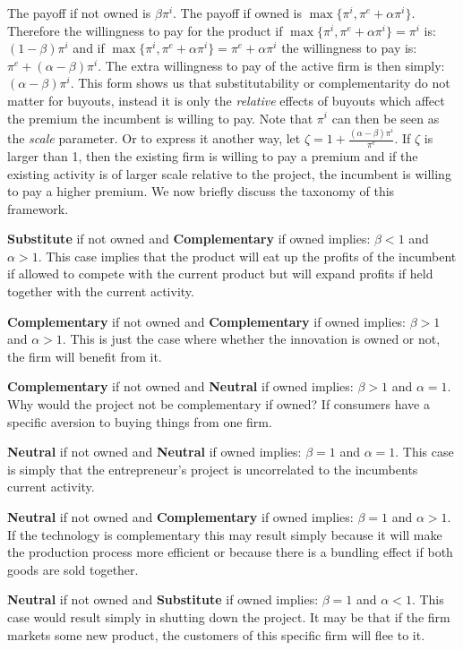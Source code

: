The payoff if not owned is $ \beta \pi^i$. The payoff if owned is $\max\{ \pi^i, \pi^e + \alpha \pi^i   \}$. Therefore the willingness to pay for the product if  $\max\{ \pi^i, \pi^e + \alpha \pi^i   \} = \pi^i $ is: $(1-\beta) \pi^i$ and if $\max\{ \pi^i, \pi^e + \alpha \pi^i   \} = \pi^e + \alpha \pi^i $ the willingness to pay is: $\pi^e+ (\alpha-\beta) \pi^i$. The extra willingness to pay of the active firm is then simply: $(\alpha-\beta)\pi^i$. This form shows us that substitutability or complementarity do not matter for buyouts, instead it is only the \textit{relative} effects of buyouts which affect the premium the incumbent is willing to pay. Note that $\pi^i$ can then be seen as the \textit{scale} parameter. Or to express it another way, let $\zeta=1 + \frac{(\alpha-\beta)\pi^i}{\pi^e}$. If $\zeta$ is larger than 1, then the existing firm is willing to pay a premium and if the existing activity is of larger scale relative to the project, the incumbent is willing to pay a higher premium. We now briefly discuss the taxonomy of this framework. 

\textbf{Substitute}  if not owned and \textbf{Complementary} if owned implies: $\beta<1$ and $\alpha>1$. This case implies that the product will eat up the profits of the incumbent if allowed to compete with the current product but will expand profits if held together with the current activity. 

\textbf{Complementary} if not owned and \textbf{Complementary} if owned implies: $\beta>1$ and $\alpha>1$. This is just the case where whether the innovation is owned or not, the firm will benefit from it.

\textbf{Complementary} if not owned and \textbf{Neutral} if owned implies: $\beta>1$ and $\alpha=1$. Why would the project not be complementary if owned? If consumers have a specific aversion to buying things from one firm. 

\textbf{Neutral} if not owned and \textbf{Neutral} if owned implies: $\beta=1$ and $\alpha=1$. This case is simply that the entrepreneur's project is uncorrelated to the incumbents current activity.  

\textbf{Neutral} if not owned and \textbf{Complementary} if owned implies: $\beta=1$ and $\alpha>1$. If the technology is complementary this may result simply because it will make the production process more efficient or because there is a bundling effect if both goods are sold together. 

\textbf{Neutral} if not owned and \textbf{Substitute} if owned implies: $\beta=1$ and $\alpha<1$. This case would result simply in shutting down the project. It may be that if the firm markets some new product, the customers of this specific firm will flee to it. 

